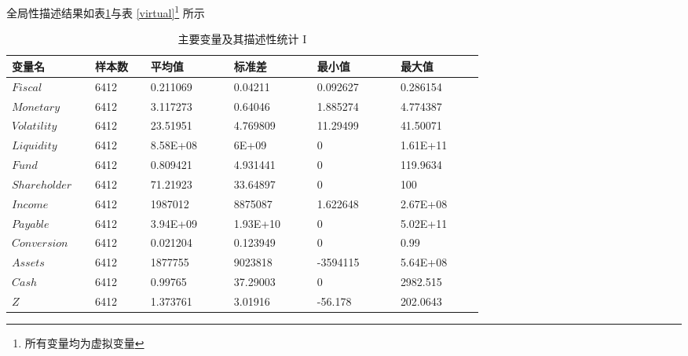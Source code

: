 全局性描述结果如表\ref{globaldesc}与表 \ref{virtual}\footnote{所有变量均为虚拟变量} 所示

\begin{table}[ht]
	\caption{主要变量及其描述性统计 I }
	\label{globaldesc}
	\begin{tabular}{p{0.15\linewidth}p{0.1\linewidth}p{0.15\linewidth}p{0.15\linewidth}p{0.15\linewidth}p{0.15\linewidth}}
		\toprule
		\textbf{变量名}    & \textbf{样本数} & \textbf{平均值} & \textbf{标准差} & \textbf{最小值} & \textbf{最大值} \\ \midrule
		\(Fiscal\)      & 6412         & 0.211069     & 0.04211      & 0.092627     & 0.286154     \\
		\(Monetary\)    & 6412         & 3.117273     & 0.64046      & 1.885274     & 4.774387     \\
		\(Volatility\)  & 6412         & 23.51951     & 4.769809     & 11.29499     & 41.50071     \\
		\(Liquidity\)   & 6412         & 8.58E+08     & 6E+09        & 0            & 1.61E+11     \\
		\(Fund\)        & 6412         & 0.809421     & 4.931441     & 0            & 119.9634     \\
		\(Shareholder\) & 6412         & 71.21923     & 33.64897     & 0            & 100          \\
		\(Income\)      & 6412         & 1987012      & 8875087      & 1.622648     & 2.67E+08     \\
		\(Payable\)     & 6412         & 3.94E+09     & 1.93E+10     & 0            & 5.02E+11     \\
		\(Conversion\)  & 6412         & 0.021204     & 0.123949     & 0            & 0.99         \\
		\(Assets\)      & 6412         & 1877755      & 9023818      & -3594115     & 5.64E+08     \\
		\(Cash\)        & 6412         & 0.99765      & 37.29003     & 0            & 2982.515     \\
		\(Z\)           & 6412         & 1.373761     & 3.01916      & -56.178      & 202.0643     \\
		\bottomrule
	\end{tabular}
\end{table}
